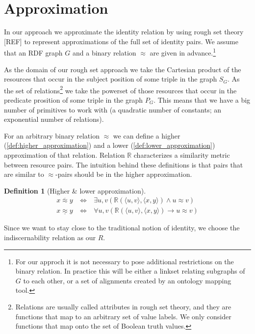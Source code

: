 \documentclass[letterpaper]{article}
\newtheorem{definition}{Definition}
\begin{document}
\section{Approximation}
\label{sec:approximation}

In our approach we approximate the identity relation by using rough set theory [REF] to represent approximations of the full set of identity pairs. We assume that an RDF graph $G$ and a binary relation $\approx$ are given in advance.\footnote{For our approch it is not necessary to pose additional restrictions on the binary relation. In practice this will be either a linkset relating subgraphs of $G$ to each other, or a set of alignments created by an ontology mapping tool.}

As the domain of our rough set approach we take the Cartesian product of the resources that occur in the subject position of some triple in the graph $S_G$. As the set of relations\footnote{Relations are usually called attributes in rough set theory, and they are functions that map to an arbitrary set of value labels. We only consider functions that map onto the set of Boolean truth values.} we take the powerset of those resources that occur in the predicate prosition of some triple in the graph $P_G$. This means that we have a big number of primitives to work with (a quadratic number of constants; an exponential number of relations).

For an arbitrary binary relation $\approx$ we can define a higher (\ref{def:higher_approximation}) and a lower (\ref{def:lower_approximation}) approximation of that relation. Relation $\mathbb{R}$ characterizes a similarity metric between resource pairs. The intuition behind these definitions is that pairs that are similar to $\approx$-pairs should be in the higher approximation. 

\begin{definition}[Higher \& lower approximation]
\begin{align}
x \overline{\approx} y \  & \iff & \ 
  \exists u,v (
      \mathbb{R}(\langle u, v \rangle, \langle x, y \rangle)
    \land
      u \approx v
  )
\label{def:higher_approximation}
\\
x \underline{\approx} y \  & \iff & \ 
  \forall u,v (
      \mathbb{R}(\langle u, v \rangle, \langle x, y \rangle)
    \rightarrow
      u \approx v
  )
\label{def:lower_approximation}
\end{align}
\end{definition}

Since we want to stay close to the traditional notion of identity, we choose the indiscernability relation as our $R$.
\end{document}
